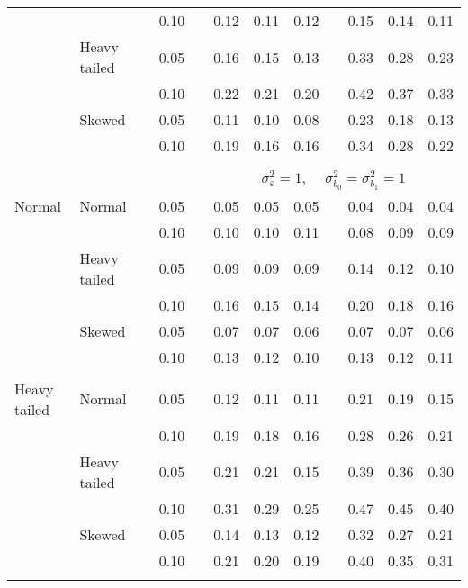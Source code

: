 \begin{table}[ht]
\begin{scriptsize}
\begin{tabular}{ll p{.1cm} c p{.1cm} rrr p{.1cm} rrr}
             &              && 0.10 &&  0.12 & 0.11 & 0.12 && 0.15 & 0.14 & 0.11 \\ 
             & Heavy tailed && 0.05 &&  0.16 & 0.15 & 0.13 && 0.33 & 0.28 & 0.23 \\ 
             &              && 0.10 &&  0.22 & 0.21 & 0.20 && 0.42 & 0.37 & 0.33 \\ 
             & Skewed       && 0.05 &&  0.11 & 0.10 & 0.08 && 0.23 & 0.18 & 0.13 \\ 
             &              && 0.10 &&  0.19 & 0.16 & 0.16 && 0.34 & 0.28 & 0.22 \\ 

&&&&&&&&&&&\\
& && && \multicolumn{7}{c}{$\sigma_{\varepsilon}^2 = 1$, \ \ $\sigma_{b_0}^2 = \sigma_{b_1}^2 = 1$} \\ \cline{6-12}
\rowcolor{gray!20}Normal       & Normal       && 0.05 &&  0.05 & 0.05 & 0.05 && 0.04 & 0.04 & 0.04 \\ 
\rowcolor{gray!20}             &              && 0.10 &&  0.10 & 0.10 & 0.11 && 0.08 & 0.09 & 0.09 \\ 
\rowcolor{gray!20}             & Heavy tailed && 0.05 &&  0.09 & 0.09 & 0.09 && 0.14 & 0.12 & 0.10 \\ 
\rowcolor{gray!20}             &              && 0.10 &&  0.16 & 0.15 & 0.14 && 0.20 & 0.18 & 0.16 \\ 
\rowcolor{gray!20}             & Skewed       && 0.05 &&  0.07 & 0.07 & 0.06 && 0.07 & 0.07 & 0.06 \\ 
\rowcolor{gray!20}             &              && 0.10 &&  0.13 & 0.12 & 0.10 && 0.13 & 0.12 & 0.11 \\ 
             &&&&&&&&&&&\\
Heavy tailed & Normal       && 0.05 &&  0.12 & 0.11 & 0.11 && 0.21 & 0.19 & 0.15 \\ 
             &              && 0.10 &&  0.19 & 0.18 & 0.16 && 0.28 & 0.26 & 0.21 \\ 
             & Heavy tailed && 0.05 &&  0.21 & 0.21 & 0.15 && 0.39 & 0.36 & 0.30 \\ 
             &              && 0.10 &&  0.31 & 0.29 & 0.25 && 0.47 & 0.45 & 0.40 \\ 
             & Skewed       && 0.05 &&  0.14 & 0.13 & 0.12 && 0.32 & 0.27 & 0.21 \\ 
             &              && 0.10 &&  0.21 & 0.20 & 0.19 && 0.40 & 0.35 & 0.31 \\ 
             &&&&&&&&&&&\\

\end{tabular}
\end{scriptsize}
\end{table}
